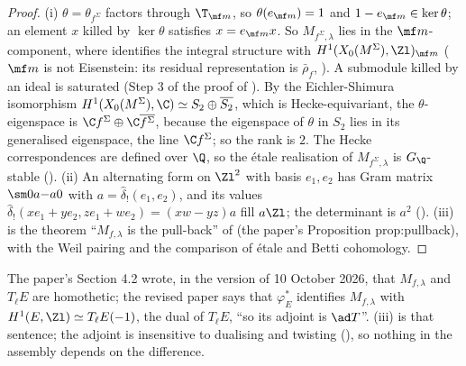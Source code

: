 \begin{proof}
(i) $\theta=\theta_{f^\Sigma}$ factors through $\T_{\mf m}$, so $\theta(e_{\mf m})=1$ and $1-e_{\mf m}\in\ker\theta$; an element $x$ killed by $\ker\theta$ satisfies $x=e_{\mf m}x$. So $M_{f^\Sigma,\lambda}$ lies in the
$\mf m$-component, where  identifies the integral structure with $H^1(X_0(M^\Sigma),\Zl)_{\mf m}$ ($\mf m$ is not Eisenstein: its residual
representation is $\bar\rho_f$, ). A submodule killed by an ideal is saturated (Step 3 of the proof of ). By the Eichler-Shimura
isomorphism $H^1(X_0(M^\Sigma),\C)\simeq S_2\oplus\overline{S_2}$, which is Hecke-equivariant, the $\theta$-eigenspace is $\C f^\Sigma\oplus\C\overline{f^\Sigma}$, because the eigenspace of $\theta$ in $S_2$ lies in its
generalised eigenspace, the line $\C f^\Sigma$; so the rank is $2$. The Hecke correspondences are defined over $\Q$, so the \'etale realisation of $M_{f^\Sigma,\lambda}$ is $G_\Q$-stable
(). (ii) An alternating form on $\Zl^2$ with basis $e_1,e_2$ has Gram matrix $\sm0a{-a}0$ with $a=\hat\delta_!(e_1,e_2)$, and its values $\hat\delta_!(xe_1+ye_2,ze_1+we_2)=(xw-yz)a$ fill $a\Zl$; the
determinant is $a^2$ (). (iii) is the theorem ``$M_{f,\lambda}$ is the pull-back'' of  (the paper's Proposition prop:pullback), with the Weil pairing
and the comparison of \'etale and Betti cohomology.
\end{proof}

\begin{paperlink}
The paper's Section 4.2 wrote, in the version of 10 October 2026, that $M_{f,\lambda}$ and $T_\ell E$ are homothetic; the revised paper says that $\varphi_E^*$ identifies $M_{f,\lambda}$ with
$H^1(E,\Zl)\simeq T_\ell E(-1)$, the dual of $T_\ell E$, ``so its adjoint is $\ad T$''. (iii) is that sentence; the adjoint is insensitive to dualising and twisting
(), so nothing in the assembly depends on the difference.
\end{paperlink}

